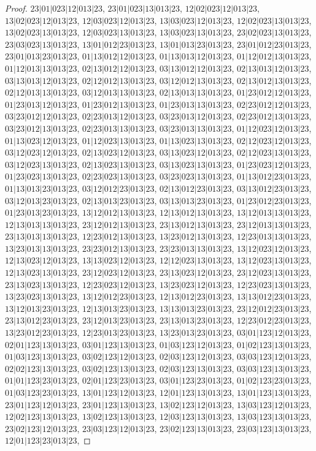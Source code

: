 \documentclass[12pt]{article}
\theoremstyle{plain}
\theoremstyle{definition}
\theoremstyle{remark}
\begin{document}
\begin{proof}
$23|01|023|12|013|23$, $23|01|023|13|013|23$, $12|02|023|12|013|23$, $13|02|023|12|013|23$, $12|03|023|12|013|23$, $13|03|023|12|013|23$, $12|02|023|13|013|23$, $13|02|023|13|013|23$, $12|03|023|13|013|23$, $13|03|023|13|013|23$, $23|02|023|13|013|23$, $23|03|023|13|013|23$, $13|01|012|23|013|23$, $13|01|013|23|013|23$, $23|01|012|23|013|23$, $23|01|013|23|013|23$, $01|13|012|12|013|23$, $01|13|013|12|013|23$, $01|12|012|13|013|23$, $01|12|013|13|013|23$, $02|13|012|12|013|23$, $03|13|012|12|013|23$, $02|13|013|12|013|23$, $03|13|013|12|013|23$, $02|12|012|13|013|23$, $03|12|012|13|013|23$, $02|13|012|13|013|23$, $02|12|013|13|013|23$, $03|12|013|13|013|23$, $02|13|013|13|013|23$, $01|23|012|12|013|23$, $01|23|013|12|013|23$, $01|23|012|13|013|23$, $01|23|013|13|013|23$, $02|23|012|12|013|23$, $03|23|012|12|013|23$, $02|23|013|12|013|23$, $03|23|013|12|013|23$, $02|23|012|13|013|23$, $03|23|012|13|013|23$, $02|23|013|13|013|23$, $03|23|013|13|013|23$, $01|12|023|12|013|23$, $01|13|023|12|013|23$, $01|12|023|13|013|23$, $01|13|023|13|013|23$, $02|12|023|12|013|23$, $03|12|023|12|013|23$, $02|13|023|12|013|23$, $03|13|023|12|013|23$, $02|12|023|13|013|23$, $03|12|023|13|013|23$, $02|13|023|13|013|23$, $03|13|023|13|013|23$, $01|23|023|12|013|23$, $01|23|023|13|013|23$, $02|23|023|13|013|23$, $03|23|023|13|013|23$, $01|13|012|23|013|23$, $01|13|013|23|013|23$, $03|12|012|23|013|23$, $02|13|012|23|013|23$, $03|13|012|23|013|23$, $03|12|013|23|013|23$, $02|13|013|23|013|23$, $03|13|013|23|013|23$, $01|23|012|23|013|23$, $01|23|013|23|013|23$, $13|12|012|13|013|23$, $12|13|012|13|013|23$, $13|12|013|13|013|23$, $12|13|013|13|013|23$, $23|12|012|13|013|23$, $23|13|012|13|013|23$, $23|12|013|13|013|23$, $23|13|013|13|013|23$, $12|23|012|13|013|23$, $13|23|012|13|013|23$, $12|23|013|13|013|23$, $13|23|013|13|013|23$, $23|23|012|13|013|23$, $23|23|013|13|013|23$, $13|12|023|12|013|23$, $12|13|023|12|013|23$, $13|13|023|12|013|23$, $12|12|023|13|013|23$, $13|12|023|13|013|23$, $12|13|023|13|013|23$, $23|12|023|12|013|23$, $23|13|023|12|013|23$, $23|12|023|13|013|23$, $23|13|023|13|013|23$, $12|23|023|12|013|23$, $13|23|023|12|013|23$, $12|23|023|13|013|23$, $13|23|023|13|013|23$, $13|12|012|23|013|23$, $12|13|012|23|013|23$, $13|13|012|23|013|23$, $13|12|013|23|013|23$, $12|13|013|23|013|23$, $13|13|013|23|013|23$, $23|12|012|23|013|23$, $23|13|012|23|013|23$, $23|12|013|23|013|23$, $23|13|013|23|013|23$, $12|23|012|23|013|23$, $13|23|012|23|013|23$, $12|23|013|23|013|23$, $13|23|013|23|013|23$, $03|01|123|12|013|23$, $02|01|123|13|013|23$, $03|01|123|13|013|23$, $01|03|123|12|013|23$, $01|02|123|13|013|23$, $01|03|123|13|013|23$, $03|02|123|12|013|23$, $02|03|123|12|013|23$, $03|03|123|12|013|23$, $02|02|123|13|013|23$, $03|02|123|13|013|23$, $02|03|123|13|013|23$, $03|03|123|13|013|23$, $01|01|123|23|013|23$, $02|01|123|23|013|23$, $03|01|123|23|013|23$, $01|02|123|23|013|23$, $01|03|123|23|013|23$, $13|01|123|12|013|23$, $12|01|123|13|013|23$, $13|01|123|13|013|23$, $23|01|123|12|013|23$, $23|01|123|13|013|23$, $13|02|123|12|013|23$, $13|03|123|12|013|23$, $12|02|123|13|013|23$, $13|02|123|13|013|23$, $12|03|123|13|013|23$, $13|03|123|13|013|23$, $23|02|123|12|013|23$, $23|03|123|12|013|23$, $23|02|123|13|013|23$, $23|03|123|13|013|23$, $12|01|123|23|013|23$, 
\end{proof}
\end{document}

